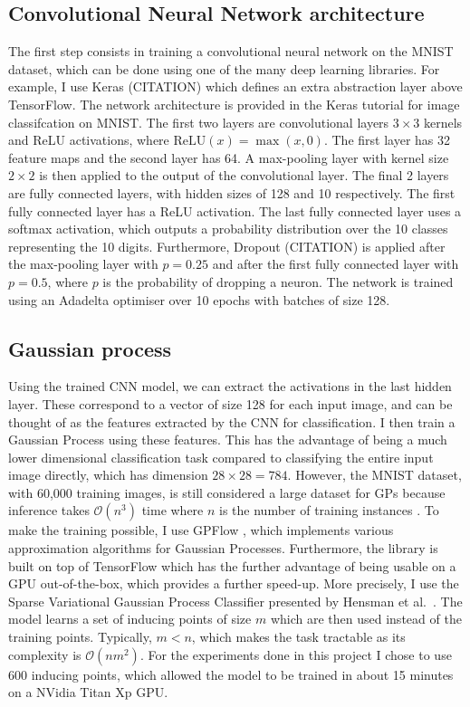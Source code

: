 \documentclass{article}
\begin{document}
\subsection{Convolutional Neural Network architecture}
The first step consists in training a convolutional neural network on the MNIST dataset, which can be done using one of the many deep learning libraries. For example, I use Keras (CITATION) which defines an extra abstraction layer above TensorFlow. The network architecture is provided in the Keras tutorial for image classifcation on MNIST. The first two layers are convolutional layers $3 \times 3$ kernels and ReLU activations, where $\textrm{ReLU}(x) = \max(x, 0)$. The first layer has 32 feature maps and the second layer has 64. A max-pooling layer with kernel size $2 \times 2$ is then applied to the output of the convolutional layer. The final 2 layers are fully connected layers, with hidden sizes of 128 and 10 respectively. The first fully connected layer has a ReLU activation. The last fully connected layer uses a softmax activation, which outputs a probability distribution over the 10 classes representing the 10 digits. Furthermore, Dropout (CITATION) is applied after the max-pooling layer with $p=0.25$ and after the first fully connected layer with $p=0.5$, where $p$ is the probability of dropping a neuron. The network is trained using an Adadelta optimiser over 10 epochs with batches of size 128.

\subsection{Gaussian process}
Using the trained CNN model, we can extract the activations in the last hidden layer. These correspond to a vector of size 128 for each input image, and can be thought of as the features extracted by the CNN for classification. I then train a Gaussian Process using these features. This has the advantage of being a much lower dimensional classification task compared to classifying the entire input image directly, which has dimension $28 \times 28 = 784$. However, the MNIST dataset, with 60,000 training images, is still considered a large dataset for GPs because inference takes $\mathcal{O}(n^3)$ time where $n$ is the number of training instances \cite{hensman2015scalable}. To make the training possible, I use GPFlow \cite{GPflow2017}, which implements various approximation algorithms for Gaussian Processes. Furthermore, the library is built on top of TensorFlow which has the further advantage of being usable on a GPU out-of-the-box, which provides a further speed-up. More precisely, I use the Sparse Variational Gaussian Process Classifier presented by Hensman et al.\ \cite{hensman2015scalable}. The model learns a set of inducing points of size $m$ which are then used instead of the training points. Typically, $m < n$, which makes the task tractable as its complexity is $\mathcal{O}(nm^2)$. For the experiments done in this project I chose to use 600 inducing points, which allowed the model to be trained in about 15 minutes on a NVidia Titan Xp GPU.
\end{document}
